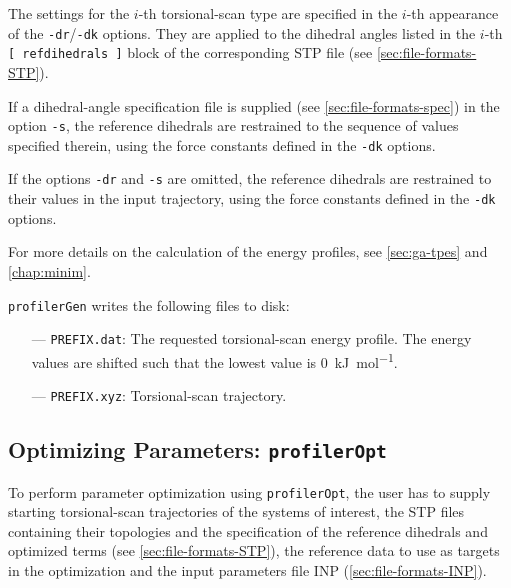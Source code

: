 \documentclass[10pt,a4paper,openany]{memoir}
\numberwithin{equation}{section}
\newcommand{\profileropt}[0]{\texttt{profilerOpt}}
\newcommand{\profilergen}[0]{\texttt{profilerGen}}
\begin{document}
The settings for the $i$-th torsional-scan type are specified in the
$i$-th appearance of the \texttt{-dr}/\texttt{-dk} options. They are
applied to the dihedral angles listed in the $i$-th
\texttt{[~refdihedrals~]} block of the corresponding STP file (see
\autoref{sec:file-formats-STP}).
%

If a dihedral-angle specification file is supplied (see
\autoref{sec:file-formats-spec}) in the option \texttt{-s}, the
reference dihedrals are restrained to the sequence of values specified
therein, using the force constants defined in the \texttt{-dk}
options.

%
If the options \texttt{-dr} and \texttt{-s} are omitted, the reference
dihedrals are restrained to their values in the input trajectory,
using the force constants defined in the \texttt{-dk} options.
%

For more details on the calculation of the energy profiles, see
\autoref{sec:ga-tpes} and \autoref{chap:minim}.

\profilergen{} writes the following files to disk:
\begin{itemize}
\item[---] \texttt{PREFIX.dat}: The requested torsional-scan energy profile. The energy values are shifted such that the lowest value is \SI{0}{\kJ\per\mole}.
\item[---] \texttt{PREFIX.xyz}: Torsional-scan trajectory.
\end{itemize}


\subsection{Optimizing Parameters: \profileropt{}}
\label{sec:program-opt}

To perform parameter optimization using \profileropt{}, the user has
to supply starting torsional-scan trajectories of the systems of
interest, the STP files containing their topologies and the
specification of the reference dihedrals and optimized terms (see
\autoref{sec:file-formats-STP}), the reference data to use as targets
in the optimization and the input parameters file INP
(\autoref{sec:file-formats-INP}).
\end{document}
